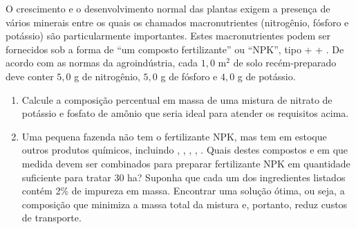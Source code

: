 O crescimento e o desenvolvimento normal das plantas exigem a presença
de vários minerais entre os quais os chamados macronutrientes (nitrogênio,
fósforo e potássio) são particularmente importantes. Estes macronutrientes
podem ser fornecidos sob a forma de “um composto fertilizante” ou “NPK”, tipo
 +  + .
De acordo com as normas da agroindústria, cada $1,0$ m$^2$ de solo recém-preparado deve conter $5,0$ g de nitrogênio, $5,0$ g de fósforo e $4,0$ g de potássio.

\begin{enumerate}[label=(\alph*)]
	\item Calcule a composição percentual em massa de uma mistura de nitrato de potássio e fosfato de amônio que seria ideal para atender os requisitos acima.
	\item Uma pequena fazenda não tem o fertilizante NPK, mas tem em estoque outros produtos químicos, incluindo , , , , .
		Quais destes compostos e em que medida devem ser combinados para preparar fertilizante NPK em quantidade suficiente para tratar $30$ ha?
		Suponha que cada um dos ingredientes listados contém 2\% de impureza em massa.
		Encontrar uma solução ótima, ou seja, a composição que minimiza a massa total da mistura e, portanto, reduz custos de transporte.
\end{enumerate}
